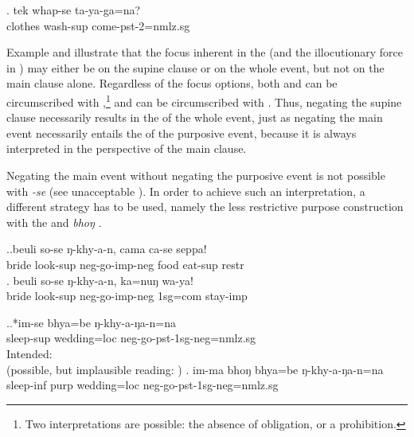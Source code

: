 \exg. tek whap-se ta-ya-ga=na?\\
		clothes   wash{\sc -sup} come{\sc -pst-2=nmlz.sg}\\

Example \Next  and \NNext illustrate that the focus inherent in the  (and the illocutionary force in \Next) may either be on the supine clause or on the whole event, but not on the main clause alone. Regardless of the focus options, both \Next[a] and \Next[b] can be circumscribed with ,\footnote{Two interpretations are possible: the absence of obligation, or a prohibition.} and \LLast[a] can be circumscribed with . Thus, negating the supine clause necessarily results in the  of the whole event, just as negating the main event necessarily entails the  of the purposive event, because it is always interpreted in the perspective of the main clause. 

Negating the main event without negating the purposive event is not possible with \emph{-se} (see unacceptable \NNext[a]).  In order to achieve such an interpretation, a different strategy has to be used, namely the less restrictive purpose construction with the  and \emph{bhoŋ} \NNext[b].  

\ex.\ag.beuli so-se ŋ-khy-a-n, cama ca-se seppa!\\
bride   look{\sc -sup}   {\sc neg-}go{\sc -imp-neg} food   eat{\sc -sup} {\sc restr}\\
\bg. beuli so-se ŋ-khy-a-n, ka=nuŋ wa-ya!\\
bride   look{\sc -sup} {\sc neg-}go{\sc -imp-neg} {\sc 1sg=com} stay{\sc -imp}\\

\ex.\ag.*im-se bhya=be ŋ-khy-a-ŋa-n=na\\
sleep{\sc -sup} wedding{\sc =loc} {\sc neg-}go{\sc -pst-1sg-neg=nmlz.sg}\\
Intended:  \\
(possible, but implausible reading: )
\bg. im-ma bhoŋ bhya=be ŋ-khy-a-ŋa-n=na\\
sleep{\sc -inf} {\sc purp} wedding{\sc =loc} {\sc neg-}go{\sc -pst-1sg-neg=nmlz.sg}\\


